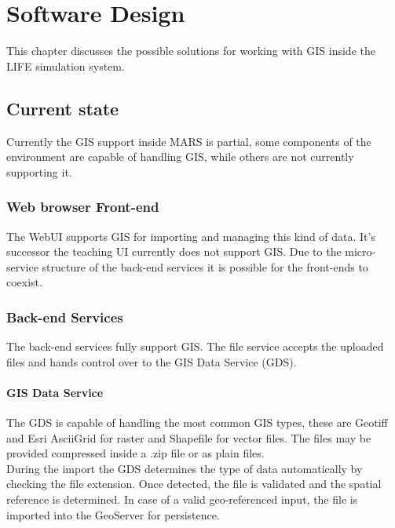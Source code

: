 
\chapter{Software Design}
This chapter discusses the possible solutions for working with GIS inside the LIFE simulation system.



\section{Current state}
Currently the GIS support inside MARS is partial, some components of the environment are capable of handling GIS, while others are not currently supporting it.


\subsection{Web browser Front-end}
The WebUI supports GIS for importing and managing this kind of data. It's successor the teaching UI currently does not support GIS. Due to the micro-service structure of the back-end services it is possible for the front-ends to coexist.

\subsection{Back-end Services}
The back-end services fully support GIS. The file service accepts the uploaded files and hands control over to the GIS Data Service (GDS). 

\subsubsection{GIS Data Service}
The GDS is capable of handling the most common GIS types, these are Geotiff and Esri AsciiGrid for raster and Shapefile for vector files. The files may be provided compressed inside a .zip file or as plain files.\\
During the import the GDS determines the type of data automatically by checking the file extension. Once detected, the file is validated and the spatial reference is determined. In case of a valid geo-referenced input, the file is imported into the GeoServer for persistence.


